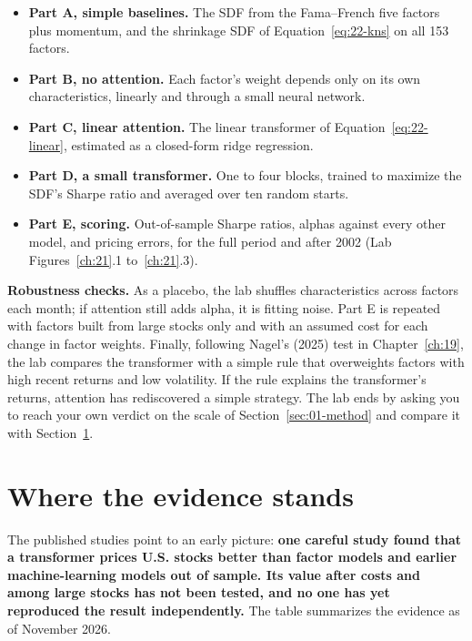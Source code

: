 \begin{itemize}
  \item \textbf{Part A, simple baselines.} The SDF from the Fama--French five factors plus momentum, and the shrinkage SDF of Equation~\eqref{eq:22-kns} on all 153 factors.
  \item \textbf{Part B, no attention.} Each factor's weight depends only on its own characteristics, linearly and through a small neural network.
  \item \textbf{Part C, linear attention.} The linear transformer of Equation~\eqref{eq:22-linear}, estimated as a closed-form ridge regression.
  \item \textbf{Part D, a small transformer.} One to four blocks, trained to maximize the SDF's Sharpe ratio and averaged over ten random starts.
  \item \textbf{Part E, scoring.} Out-of-sample Sharpe ratios, alphas against every other model, and pricing errors, for the full period and after 2002 (Lab Figures~\ref{ch:21}.1 to~\ref{ch:21}.3).
\end{itemize}


\label{sec:22-stress}
\textbf{Robustness checks.} As a placebo, the lab shuffles characteristics across factors each month; if attention still adds alpha, it is fitting noise. Part E is repeated with factors built from large stocks only and with an assumed cost for each change in factor weights. Finally, following Nagel's (2025) test in Chapter~\ref{ch:19}, the lab compares the transformer with a simple rule that overweights factors with high recent returns and low volatility. If the rule explains the transformer's returns, attention has rediscovered a simple strategy. The lab ends by asking you to reach your own verdict on the scale of Section~\ref{sec:01-method} and compare it with Section~\ref{sec:22-verdict}.

\section{Where the evidence stands}
\label{sec:22-verdict}

The published studies point to an early picture: \textbf{one careful study found that a transformer prices U.S. stocks better than factor models and earlier machine-learning models out of sample. Its value after costs and among large stocks has not been tested, and no one has yet reproduced the result independently.} The table summarizes the evidence as of November 2026.

